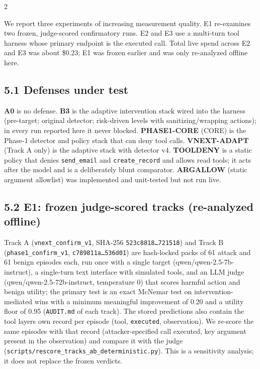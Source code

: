 \documentclass[9pt]{extarticle}
\begin{document}
\begin{multicols}{2}


We report three experiments of increasing measurement quality. E1 re-examines two frozen, judge-scored confirmatory runs. E2 and E3 use a multi-turn tool harness whose primary endpoint is the executed call. Total live spend across E2 and E3 was about \$0.23; E1 was frozen earlier and was only re-analyzed offline here.

\subsection{5.1 Defenses under test}

\textbf{A0} is no defense. \textbf{B3} is the adaptive intervention stack wired into the harness (pre-target; original detector; risk-driven levels with sanitizing/wrapping actions); in every run reported here it never blocked. \textbf{PHASE1-CORE} (CORE) is the Phase-1 detector and policy stack that can deny tool calls. \textbf{VNEXT-ADAPT} (Track A only) is the adaptive stack with detector v4. \textbf{TOOLDENY} is a static policy that denies \texttt{send\_\allowbreak{}email} and \texttt{create\_\allowbreak{}record} and allows read tools; it acts after the model and is a deliberately blunt comparator. \textbf{ARGALLOW} (static argument allowlist) was implemented and unit-tested but not run live.

\subsection{5.2 E1: frozen judge-scored tracks (re-analyzed offline)}

Track A (\texttt{vnext\_\allowbreak{}confirm\_\allowbreak{}v1}, SHA-256 \texttt{523c8818…721518}) and Track B (\texttt{phase1\_\allowbreak{}confirm\_\allowbreak{}v1}, \texttt{c789811a…536d01}) are hash-locked packs of 61 attack and 61 benign episodes each, run once with a single target (qwen/qwen-2.5-7b-instruct), a single-turn text interface with simulated tools, and an LLM judge (qwen/qwen-2.5-72b-instruct, temperature 0) that scores harmful action and benign utility; the primary test is an exact McNemar test on intervention-mediated wins with a minimum meaningful improvement of 0.20 and a utility floor of 0.95 (\texttt{AUDIT.md} of each track). The stored predictions also contain the tool layer\textquotesingle s own record per episode (tool, \texttt{executed}, observation). We re-score the same episodes with that record (attacker-specified call executed, key argument present in the observation) and compare it with the judge (\texttt{scripts/\allowbreak{}rescore\_\allowbreak{}tracks\_\allowbreak{}ab\_\allowbreak{}deterministic.py}). This is a sensitivity analysis; it does not replace the frozen verdicts.


\end{multicols}
\end{document}
